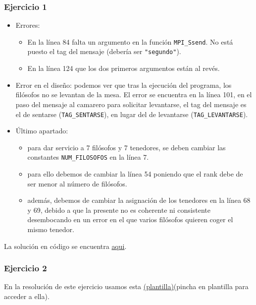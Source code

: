 \documentclass[a4paper,12pt]{article}
\begin{document}
\subsubsection*{Ejercicio 1}
\begin{itemize}
    \item Errores:
    \begin{itemize}
        \item En la línea 84 falta un argumento en la función \texttt{MPI\_Ssend}. No está puesto el tag del mensaje (debería ser \texttt{"segundo"}).
        \item En la línea 124 que los dos primeros argumentos están al revés.
    \end{itemize}
    \item Error en el diseño: podemos ver que tras la ejecución del programa, los filósofos no se levantan de la mesa. El error se encuentra en la línea 101, en el paso del mensaje al camarero para solicitar levantarse, el tag del mensaje es el de sentarse (\texttt{TAG\_SENTARSE}), en lugar del de levantarse (\texttt{TAG\_LEVANTARSE}).
    \item Último apartado: 
    \begin{itemize}
        \item para dar servicio a 7 filósofos y 7 tenedores, se deben cambiar las constantes \texttt{NUM\_FILOSOFOS} en la línea 7.
        \item para ello debemos de cambiar la línea 54 poniendo que el rank debe de ser menor al número de filósofos.
        \item además, debemos de cambiar la asignación de los tenedores en la línea 68 y 69, debido a que la presente no es coherente ni consistente desembocando en un error en el que varios filósofos quieren coger el mismo tenedor.
    \end{itemize}
\end{itemize}

La solución en código se encuentra \href{https://github.com/ElblogdeIsmael/ElblogdeIsmael.github.io/blob/main/Subjects/Third/SCD/Examenes/SegundoParcial/ETSIIT/code/ExamenCarlos/ejercicio.cpp}{aqui}.

\subsubsection*{Ejercicio 2}

En la resolución de este ejercicio usamos esta \href{https://github.com/ElblogdeIsmael/ElblogdeIsmael.github.io/blob/main/Subjects/Third/SCD/Examenes/SegundoParcial/ETSIIT/code/ExamenCarlos/prodcons2-muPlantilla.cpp}{(plantilla)}(pincha en plantilla para acceder a ella).
\end{document}
